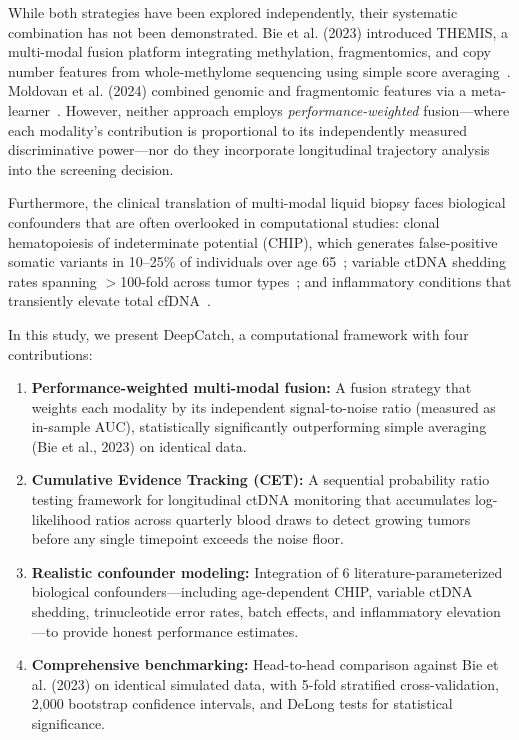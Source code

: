 \documentclass[10pt,a4paper]{article}
\begin{document}
While both strategies have been explored independently, their systematic combination has not been demonstrated. Bie et al. (2023) introduced THEMIS, a multi-modal fusion platform integrating methylation, fragmentomics, and copy number features from whole-methylome sequencing using simple score averaging~\cite{bie2023multimodal}. Moldovan et al. (2024) combined genomic and fragmentomic features via a meta-learner~\cite{moldovan2024multi}. However, neither approach employs \textit{performance-weighted} fusion—where each modality's contribution is proportional to its independently measured discriminative power—nor do they incorporate longitudinal trajectory analysis into the screening decision.

Furthermore, the clinical translation of multi-modal liquid biopsy faces biological confounders that are often overlooked in computational studies: clonal hematopoiesis of indeterminate potential (CHIP), which generates false-positive somatic variants in 10--25\% of individuals over age 65~\cite{genovese2014clonal,jaiswal2014age}; variable ctDNA shedding rates spanning $>$100-fold across tumor types~\cite{bettegowda2014detection}; and inflammatory conditions that transiently elevate total cfDNA~\cite{snyder2016cell}.

In this study, we present DeepCatch, a computational framework with four contributions:

\begin{enumerate}[nosep]
\item \textbf{Performance-weighted multi-modal fusion:} A fusion strategy that weights each modality by its independent signal-to-noise ratio (measured as in-sample AUC), statistically significantly outperforming simple averaging (Bie et al., 2023) on identical data.

\item \textbf{Cumulative Evidence Tracking (CET):} A sequential probability ratio testing framework for longitudinal ctDNA monitoring that accumulates log-likelihood ratios across quarterly blood draws to detect growing tumors before any single timepoint exceeds the noise floor.

\item \textbf{Realistic confounder modeling:} Integration of 6 literature-parameterized biological confounders—including age-dependent CHIP, variable ctDNA shedding, trinucleotide error rates, batch effects, and inflammatory elevation—to provide honest performance estimates.

\item \textbf{Comprehensive benchmarking:} Head-to-head comparison against Bie et al. (2023) on identical simulated data, with 5-fold stratified cross-validation, 2,000 bootstrap confidence intervals, and DeLong tests for statistical significance.
\end{enumerate}
\end{document}
